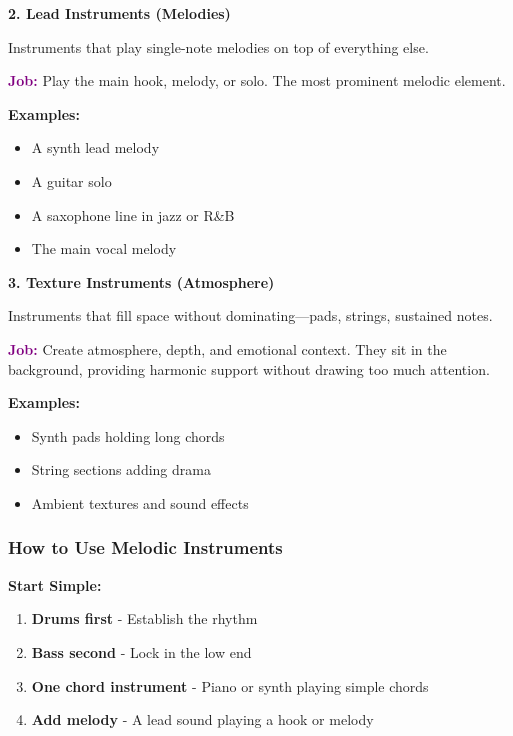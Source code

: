 \documentclass[11pt,letterpaper]{article}
\newcommand{\purple}[1]{\textcolor{purple}{\textbf{#1}}}
\begin{document}
\vspace{0.5cm}

\textbf{2. Lead Instruments (Melodies)}

Instruments that play single-note melodies on top of everything else.

\textbf{\purple{Job:}} Play the main hook, melody, or solo. The most prominent melodic element.

\textbf{Examples:}
\begin{itemize}[leftmargin=*]
\item A synth lead melody
\item A guitar solo
\item A saxophone line in jazz or R\&B
\item The main vocal melody
\end{itemize}

\vspace{0.5cm}

\textbf{3. Texture Instruments (Atmosphere)}

Instruments that fill space without dominating—pads, strings, sustained notes.

\textbf{\purple{Job:}} Create atmosphere, depth, and emotional context. They sit in the background, providing harmonic support without drawing too much attention.

\textbf{Examples:}
\begin{itemize}[leftmargin=*]
\item Synth pads holding long chords
\item String sections adding drama
\item Ambient textures and sound effects
\end{itemize}

\subsubsection{How to Use Melodic Instruments}

\textbf{Start Simple:}

\begin{enumerate}[leftmargin=*]
\item \textbf{Drums first} - Establish the rhythm
\item \textbf{Bass second} - Lock in the low end
\item \textbf{One chord instrument} - Piano or synth playing simple chords
\item \textbf{Add melody} - A lead sound playing a hook or melody
\end{enumerate}
\end{document}
